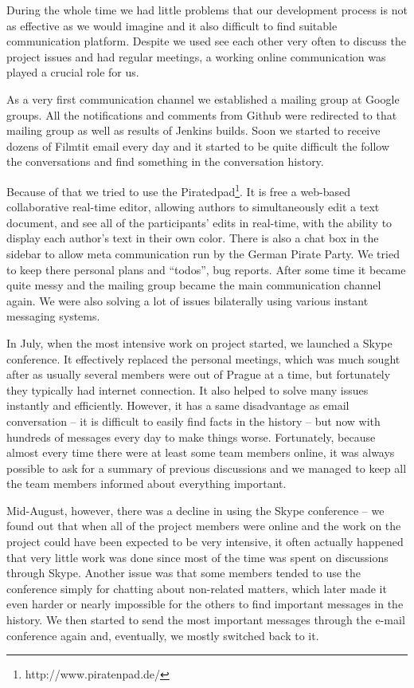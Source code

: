 During the whole time we had little problems that our development process is not as effective as we would imagine and it also difficult to find suitable communication platform. Despite we used see each other very often to discuss the project issues and had regular meetings, a working online communication was played a crucial role for us.

As a very first communication channel we established a mailing group at Google groups. All the notifications and comments from Github were redirected to that mailing group as well as results of Jenkins builds. Soon we started to receive dozens of Filmtit email every day and it started to be quite difficult the follow the conversations and find something in the conversation history.

Because of that we tried to use the Piratedpad\footnote{http://www.piratenpad.de/}. It is free a web-based collaborative real-time editor, allowing authors to simultaneously edit a text document, and see all of the participants' edits in real-time, with the ability to display each author's text in their own color. There is also a chat box in the sidebar to allow meta communication run by the German Pirate Party. We tried to keep there personal plans and ``todos'', bug reports. After some time it became quite messy and the mailing group became the main communication channel again. We were also solving a lot of issues bilaterally using various instant messaging systems.

In July, when the most intensive work on project started, we launched a Skype conference. It effectively replaced the personal meetings, which was much sought after as usually several members were out of Prague at a time, but fortunately they typically had internet connection.
It also helped to solve many issues instantly and efficiently.
However, it has a same disadvantage as email conversation -- it is difficult to easily find facts in the history -- but now with hundreds of messages every day to make things worse.
Fortunately, because almost every time there were at least some team members online, it was always possible to ask for a summary of previous discussions and we managed to keep all the team members informed about everything important.

Mid-August, however, there was a decline in using the Skype conference -- we found out that when all of the project members were online and the work on the project could have been expected to be very intensive, it often actually happened that very little work was done since most of the time was spent on discussions through Skype.
Another issue was that some members tended to use the conference simply for chatting about non-related matters, %
which later made it even harder or nearly impossible for the others to find important messages in the history.
We then started to send the most important messages through the e-mail conference again and, eventually, we mostly switched back to it.

